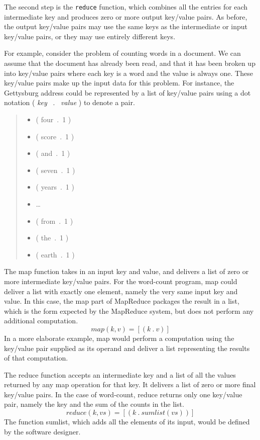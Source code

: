 The second step is the \texttt{reduce} function, which
combines all the entries for each intermediate key and
produces zero or more output key/value pairs.  As before, the
output key/value pairs may use the same keys as the
intermediate or input key/value pairs, or they may use
entirely different keys.

For example, consider the problem of counting words in a
document.  We can assume that the document has already been
read, and that it has been broken up into key/value pairs
where each key is a word and the value is always one. These
key/value pairs make up the input data for this problem. For
instance, the Gettysburg address could be represented by a
list of key/value pairs using a dot notation ( \emph{key} ~.~ \emph{value} )
to denote a pair.
\begin{quote}
\begin{itemize}
\item ( four~.~1 )
\item ( score~.~1 )
\item ( and~.~1 )
\item ( seven~.~1 )
\item ( years~.~1 )
\item \dots
\item ( from~.~1 )
\item ( the~.~1 )
\item ( earth~.~1 )
\end{itemize}
\end{quote}

The map function takes in an input key and
value, and delivers a list of zero or more intermediate
key/value pairs.  For the word-count program, map could 
deliver a list with exactly one element, namely
the very same input key and value.
In this case, the map part of MapReduce 
packages the result in a list, which is
the form expected by the MapReduce system,
but does not perform any additional computation.
\begin{displaymath}
map(k, v) = [ ( k ~.~ v ) ]
\end{displaymath}
In a more elaborate example, map would perform
a computation using the key/value pair supplied as
its operand and deliver a list representing the results
of that computation.

The reduce function accepts an intermediate key and a list of
all the values returned by any map operation for that key.  
It delivers a list of zero or more final key/value pairs.  
In the case of word-count, reduce returns only one key/value pair, 
namely the key and the sum of the counts in the list.
\begin{displaymath}
reduce(k, vs) = [ ( k ~.~ sumlist(vs) ) ]
\end{displaymath}
The function sumlist, which adds all the elements of its
input, would be defined by the software designer.


